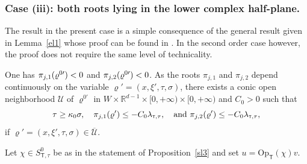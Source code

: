 \documentclass[JEP,XML,SOM,Unicode,published]{cedram}
\theoremstyle{plain}
\theoremstyle{definition}
\def\R{\mathbb{R}}
\let\k\kappa
\let\y\varrho
\let \Im \relax
\DeclareMathOperator{\Im}{Im}
\newcommand{\ovl}[1]{\overline{#1}}
\newcommand{\U}{\mathscr U}
\newcommand{\Opt}{\ensuremath{\mathrm{Op}_{\scriptscriptstyle{\mathsf{T}}}}}
\newcommand{\lsct}{\lambda_{{\scriptscriptstyle{\mathsf T}},\tau}}
\newcommand{\Ssct}{S_{{\scriptscriptstyle{\mathsf T}},\tau}}
\begin{document}
\subsubsection{Case (iii): both roots lying in the lower complex half-plane.}
\label{sec: Case 2: two roots down}

The result in the present case is a simple consequence of the general
result given in Lemma~\ref{el1} whose proof can be found in
\cite{ML}. In the second order case however, the proof does not require
the same level of technicality.

One has $\Im \pi_{j,1}(\y^{0\prime}) <0$ and $\Im \pi_{j,2}(\y^{0\prime}) <0$.
As the roots $\pi_{j,1}$ and $\pi_{j,2}$ depend continuously on the
variable $\y' = (x,\xi',\tau,\sigma)$, there exists a conic open neighborhood $\U$ of $\y^{0\prime}$ in
$W\times\R^{d-1}\times[0,+\infty) \times[0,+\infty) $ and $C_0>0$ such that
\begin{equation*}
\tau \geq \k_0 \sigma, \quad \Im\pi_{j,1}(\y')\leq - C_ 0 \lsct,
\quad \text{and}\
\Im\pi_{j,2}(\y')\leq -C_0 \lsct,
\end{equation*}
if $\y'= (x,\xi',\tau,\sigma)\in\ovl{\U}$.

Let $\chi\in \Ssct^0$ be as in the statement of Proposition~\ref{sl3} and
set $u=\Opt(\chi)v$.
\end{document}
